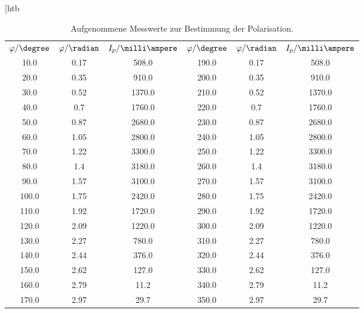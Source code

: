 \begin{table}[htb
\begin{tabular}{cccccc}
$\varphi / \degree$ & $\varphi / \radian$ & $I_p / \milli\ampere$ & $\varphi / \degree$ & $\varphi / \radian$ & $I_p / \milli\ampere$ \\
10.0 & 0.17 & 508.0 & 190.0 & 0.17 & 508.0 \\
20.0 & 0.35 & 910.0 & 200.0 & 0.35 & 910.0 \\
30.0 & 0.52 & 1370.0 & 210.0 & 0.52 & 1370.0 \\
40.0 & 0.7 & 1760.0 & 220.0 & 0.7 & 1760.0 \\
50.0 & 0.87 & 2680.0 & 230.0 & 0.87 & 2680.0 \\
60.0 & 1.05 & 2800.0 & 240.0 & 1.05 & 2800.0 \\
70.0 & 1.22 & 3300.0 & 250.0 & 1.22 & 3300.0 \\
80.0 & 1.4 & 3180.0 & 260.0 & 1.4 & 3180.0 \\
90.0 & 1.57 & 3100.0 & 270.0 & 1.57 & 3100.0 \\
100.0 & 1.75 & 2420.0 & 280.0 & 1.75 & 2420.0 \\
110.0 & 1.92 & 1720.0 & 290.0 & 1.92 & 1720.0 \\
120.0 & 2.09 & 1220.0 & 300.0 & 2.09 & 1220.0 \\
130.0 & 2.27 & 780.0 & 310.0 & 2.27 & 780.0 \\
140.0 & 2.44 & 376.0 & 320.0 & 2.44 & 376.0 \\
150.0 & 2.62 & 127.0 & 330.0 & 2.62 & 127.0 \\
160.0 & 2.79 & 11.2 & 340.0 & 2.79 & 11.2 \\
170.0 & 2.97 & 29.7 & 350.0 & 2.97 & 29.7 \\
\end{tabular}
\caption{Aufgenommene Messwerte zur Bestimmung der Polarisation.}
\label{polar}
\end{table}
